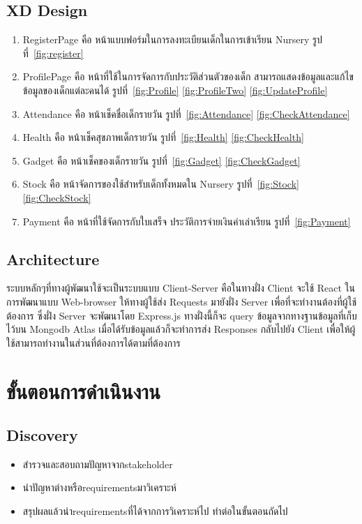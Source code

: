 \subsection{XD Design}
\begin{enumerate}
  \item RegisterPage คือ หน้าแบบฟอร์มในการลงทะเบียนเด็กในการเข้าเรียน Nursery รูปที่~\ref{fig:register}
  \item  ProfilePage  คือ หน้าที่ใช้ในการจัดการกับประวัติส่วนตัวของเด็ก สามารถแสดงข้อมูลและแก้ไขข้อมูลของเด็กแต่ละคนได้ รูปที่~\ref{fig:Profile} \ref{fig:ProfileTwo} \ref{fig:UpdateProfile}
  \item  Attendance คือ หน้าเช็คชื่อเด็กรายวัน รูปที่~\ref{fig:Attendance} \ref{fig:CheckAttendance}
  \item  Health คือ หน้าเช็คสุขภาพเด็กรายวัน รูปที่~\ref{fig:Health} \ref{fig:CheckHealth}
  \item  Gadget คือ หน้าเช็คของเด็กรายวัน รูปที่~\ref{fig:Gadget} \ref{fig:CheckGadget}
  \item  Stock คือ หน้าจัดการของใช้สำหรับเด็กทั้งหมดใน Nursery รูปที่~\ref{fig:Stock} \ref{fig:CheckStock}
  \item  Payment คือ หน้าที่ใช้จัดการกับใบเสร็จ  ประวัติการจ่ายเงินค่าเล่าเรียน รูปที่~\ref{fig:Payment}
\end{enumerate}








\subsection{Architecture}

ระบบหลักๆที่ทางผู้พัฒนาใช้จะเป็นระบบแบบ Client-Server คือในทางฝั่ง Client จะใช้ React ในการพัฒนาแบบ Web-browser ให้ทางผู้ใช้ส่ง Requests มายังฝั่ง Server เพื่อที่จะทำงานต้องที่ผู้ใช้ต้องการ ซึ่งฝั่ง Server 
จะพัฒนาโดย Express.js ทางฝั่งนี้ก็จะ query ข้อมูลจากทางฐานข้อมูลที่เก็บไว้บน Mongodb Atlas เมื่อได้รับข้อมูลแล้วก็จะทำการส่ง Responses กลับไปยัง Client เพื่อให้ผู้ใช้สามารถทำงานในส่วนที่ต้องการได้ตามที่ต้องการ

\section{ขั้นตอนการดำเนินงาน}
\subsection{Discovery}
\begin{itemize}
  \item สำรวจและสอบถามปัญหาจากstakeholder
  \item นำปัญหาต่างหรือrequirementsมาวิเคราะห์
  \item สรุปผลแล้วนำrequirementsที่ได้จากการวิเคราะห์ไป  ทำต่อในขั้นตอนถัดไป
\end{itemize}

